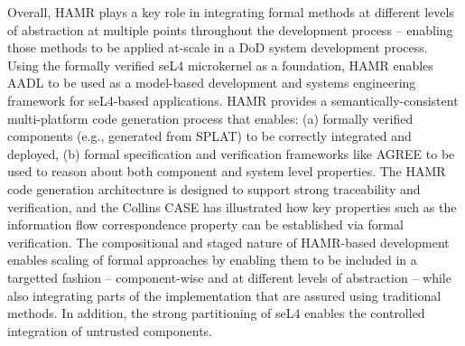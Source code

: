 Overall, HAMR plays a key role in integrating formal methods
at different levels of abstraction at multiple points throughout
the development process -- enabling those methods to be applied
at-scale in a DoD system development process.   Using the
formally verified seL4 microkernel as a foundation, HAMR enables
AADL to be used as a model-based development and systems
engineering framework for seL4-based applications.
HAMR provides a semantically-consistent multi-platform code
generation process that enables: (a) formally verified components
(e.g., generated from SPLAT) to be correctly integrated and
deployed, (b) formal specification and verification frameworks
like AGREE to be used to reason about both component and system
level properties.   The HAMR code generation architecture is
designed to support strong traceability and verification, and
the Collins CASE has illustrated how key properties such as
the information flow correspondence property can be established
via formal verification.    The compositional and staged nature
of HAMR-based development enables scaling of formal approaches
by enabling them to be included in a targetted fashion --
component-wise and at different levels of abstraction -- while
also integrating parts of the implementation that are assured
using traditional methods.   In addition, the strong partitioning
of seL4 enables the controlled integration of untrusted components.






